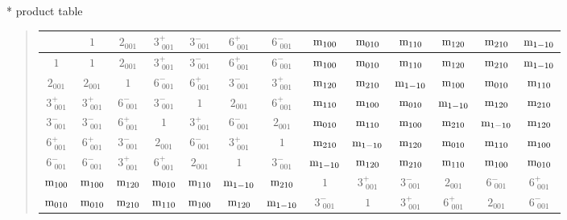 \documentclass[fleqn,10pt,landscape]{jsarticle}
\begin{document}
* product table
\begin{quote}
\begin{tabular}{ccccccccccccc} \hline \hline
 & $ 1 $ & $ 2{}_{001} $ & $ 3^{+}_{\,\,001} $ & $ 3^{-}_{\,\,001} $ & $ 6^{+}_{\,\,001} $ & $ 6^{-}_{\,\,001} $ & $ {\rm m}_{100} $ & $ {\rm m}_{010} $ & $ {\rm m}_{110} $ & $ {\rm m}_{120} $ & $ {\rm m}_{210} $ & $ {\rm m}_{1-10} $ \\ \hline
$ 1 $ & $ 1 $ & $ 2{}_{001} $ & $ 3^{+}_{\,\,001} $ & $ 3^{-}_{\,\,001} $ & $ 6^{+}_{\,\,001} $ & $ 6^{-}_{\,\,001} $ & $ {\rm m}_{100} $ & $ {\rm m}_{010} $ & $ {\rm m}_{110} $ & $ {\rm m}_{120} $ & $ {\rm m}_{210} $ & $ {\rm m}_{1-10} $ \\
$ 2{}_{001} $ & $ 2{}_{001} $ & $ 1 $ & $ 6^{-}_{\,\,001} $ & $ 6^{+}_{\,\,001} $ & $ 3^{-}_{\,\,001} $ & $ 3^{+}_{\,\,001} $ & $ {\rm m}_{120} $ & $ {\rm m}_{210} $ & $ {\rm m}_{1-10} $ & $ {\rm m}_{100} $ & $ {\rm m}_{010} $ & $ {\rm m}_{110} $ \\
$ 3^{+}_{\,\,001} $ & $ 3^{+}_{\,\,001} $ & $ 6^{-}_{\,\,001} $ & $ 3^{-}_{\,\,001} $ & $ 1 $ & $ 2{}_{001} $ & $ 6^{+}_{\,\,001} $ & $ {\rm m}_{110} $ & $ {\rm m}_{100} $ & $ {\rm m}_{010} $ & $ {\rm m}_{1-10} $ & $ {\rm m}_{120} $ & $ {\rm m}_{210} $ \\
$ 3^{-}_{\,\,001} $ & $ 3^{-}_{\,\,001} $ & $ 6^{+}_{\,\,001} $ & $ 1 $ & $ 3^{+}_{\,\,001} $ & $ 6^{-}_{\,\,001} $ & $ 2{}_{001} $ & $ {\rm m}_{010} $ & $ {\rm m}_{110} $ & $ {\rm m}_{100} $ & $ {\rm m}_{210} $ & $ {\rm m}_{1-10} $ & $ {\rm m}_{120} $ \\
$ 6^{+}_{\,\,001} $ & $ 6^{+}_{\,\,001} $ & $ 3^{-}_{\,\,001} $ & $ 2{}_{001} $ & $ 6^{-}_{\,\,001} $ & $ 3^{+}_{\,\,001} $ & $ 1 $ & $ {\rm m}_{210} $ & $ {\rm m}_{1-10} $ & $ {\rm m}_{120} $ & $ {\rm m}_{010} $ & $ {\rm m}_{110} $ & $ {\rm m}_{100} $ \\
$ 6^{-}_{\,\,001} $ & $ 6^{-}_{\,\,001} $ & $ 3^{+}_{\,\,001} $ & $ 6^{+}_{\,\,001} $ & $ 2{}_{001} $ & $ 1 $ & $ 3^{-}_{\,\,001} $ & $ {\rm m}_{1-10} $ & $ {\rm m}_{120} $ & $ {\rm m}_{210} $ & $ {\rm m}_{110} $ & $ {\rm m}_{100} $ & $ {\rm m}_{010} $ \\
$ {\rm m}_{100} $ & $ {\rm m}_{100} $ & $ {\rm m}_{120} $ & $ {\rm m}_{010} $ & $ {\rm m}_{110} $ & $ {\rm m}_{1-10} $ & $ {\rm m}_{210} $ & $ 1 $ & $ 3^{+}_{\,\,001} $ & $ 3^{-}_{\,\,001} $ & $ 2{}_{001} $ & $ 6^{-}_{\,\,001} $ & $ 6^{+}_{\,\,001} $ \\
$ {\rm m}_{010} $ & $ {\rm m}_{010} $ & $ {\rm m}_{210} $ & $ {\rm m}_{110} $ & $ {\rm m}_{100} $ & $ {\rm m}_{120} $ & $ {\rm m}_{1-10} $ & $ 3^{-}_{\,\,001} $ & $ 1 $ & $ 3^{+}_{\,\,001} $ & $ 6^{+}_{\,\,001} $ & $ 2{}_{001} $ & $ 6^{-}_{\,\,001} $ \\

\end{tabular}
\end{quote}
\end{document}
